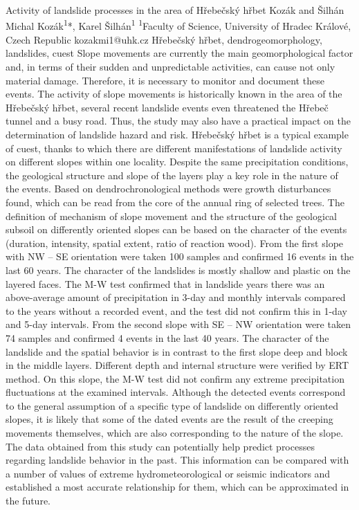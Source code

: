 \abstract
{Activity of landslide processes in the area of Hřebečský hřbet} 
{Kozák and Šilhán} 
{Michal Kozák\textsuperscript{1}*, Karel Šilhán\textsuperscript{1}} 
{\POtag} 
{
\textsuperscript{1}Faculty of Science, University of Hradec Králové, Czech Republic
}
{kozakmi1@uhk.cz}  %
{Hřebečský hřbet, dendrogeomorphology, landslides, cuest}
{Slope movements are currently the main geomorphological factor and, in terms of their sudden and unpredictable activities, can cause not only material damage. Therefore, it is necessary to monitor and document these events. The activity of slope movements is historically known in the area of the Hřebečský hřbet, several recent landslide events even threatened the Hřebeč tunnel and a busy road. Thus, the study may also have a practical impact on the determination of landslide hazard and risk. Hřebečský hřbet is a typical example of cuest, thanks to which there are different manifestations of landslide activity on different slopes within one locality. Despite the same precipitation conditions, the geological structure and slope of the layers play a key role in the nature of the events. Based on dendrochronological methods were growth disturbances found, which can  be read from the core of the annual ring of selected trees. The definition of mechanism of slope movement and the structure of the geological subsoil on differently oriented slopes can be based on the character of the events (duration, intensity, spatial extent, ratio of reaction wood). From the first slope with NW -- SE orientation were taken 100 samples and confirmed 16 events in the last 60 years. The character of the landslides is mostly shallow and plastic on the layered faces. The M-W test confirmed that in landslide years there was an above-average amount of precipitation in 3-day and monthly intervals compared to the years without a recorded event, and the test did not confirm this in 1-day and 5-day intervals. From the second slope with SE -- NW orientation were taken 74 samples and confirmed 4 events in the last 40 years. The character of the landslide and the spatial behavior is in contrast to the first slope deep and block in the middle layers. Different depth and internal structure were verified by ERT method. On this slope, the M-W test did not confirm any extreme precipitation fluctuations at the examined intervals. Although the detected events correspond to the general assumption of a specific type of landslide on differently oriented slopes, it is likely that some of the dated events are the result of the creeping movements themselves, which are also corresponding to the nature of the slope. The data obtained from this study can potentially help predict processes regarding landslide behavior in the past. This information can be compared with a number of values of extreme hydrometeorological or seismic indicators and  established a most accurate relationship for them, which can be approximated in the future.
}
